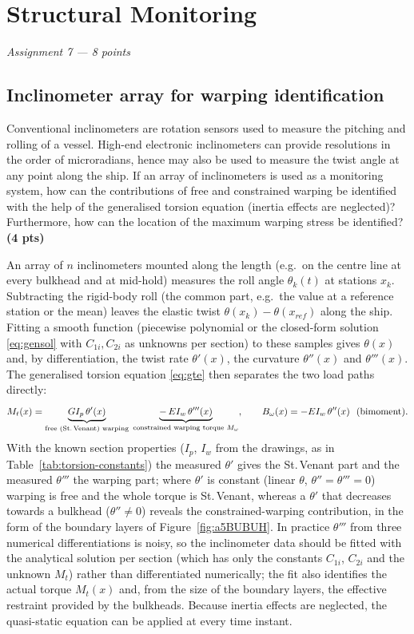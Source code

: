 \chapter{Structural Monitoring}
\label{ch:assignment7}

\begingroup\itshape Assignment 7 --- 8 points\endgroup

\section{Inclinometer array for warping identification}

Conventional inclinometers are rotation sensors used to measure the pitching and rolling of a vessel. High-end electronic inclinometers can provide resolutions in the order of microradians, hence may also be used to measure the twist angle at any point along the ship. If an array of inclinometers is used as a monitoring system, how can the contributions of free and constrained warping be identified with the help of the generalised torsion equation (inertia effects are neglected)? Furthermore, how can the location of the maximum warping stress be identified? \textbf{(4 pts)}

\bigskip
An array of $n$ inclinometers mounted along the length (e.g.\ on the centre line at every bulkhead and at mid-hold) measures the roll angle $\theta_k(t)$ at stations $x_k$. Subtracting the rigid-body roll (the common part, e.g.\ the value at a reference station or the mean) leaves the elastic twist $\theta(x_k)-\theta(x_{ref})$ along the ship. Fitting a smooth function (piecewise polynomial or the closed-form solution \eqref{eq:gensol} with $C_{1i},C_{2i}$ as unknowns per section) to these samples gives $\theta(x)$ and, by differentiation, the twist rate $\theta'(x)$, the curvature $\theta''(x)$ and $\theta'''(x)$. The generalised torsion equation \eqref{eq:gte} then separates the two load paths directly:
\begin{equation}
  M_t(x)=\underbrace{GI_p\,\theta'(x)}_{\text{free (St.\,Venant) warping}}\;\underbrace{-\,EI_w\,\theta'''(x)}_{\text{constrained warping torque } M_\omega},\qquad
  B_\omega(x)=-EI_w\,\theta''(x)\ \ \text{(bimoment)}.
\end{equation}
With the known section properties ($I_p$, $I_w$ from the drawings, as in Table~\ref{tab:torsion-constants}) the measured $\theta'$ gives the St.\,Venant part and the measured $\theta'''$ the warping part; where $\theta'$ is constant (linear $\theta$, $\theta''=\theta'''=0$) warping is free and the whole torque is St.\,Venant, whereas a $\theta'$ that decreases towards a bulkhead ($\theta''\ne0$) reveals the constrained-warping contribution, in the form of the boundary layers of Figure~\ref{fig:a5BUBUH}. In practice $\theta'''$ from three numerical differentiations is noisy, so the inclinometer data should be fitted with the analytical solution per section (which has only the constants $C_{1i}$, $C_{2i}$ and the unknown $M_t$) rather than differentiated numerically; the fit also identifies the actual torque $M_t(x)$ and, from the size of the boundary layers, the effective restraint provided by the bulkheads. Because inertia effects are neglected, the quasi-static equation can be applied at every time instant.

